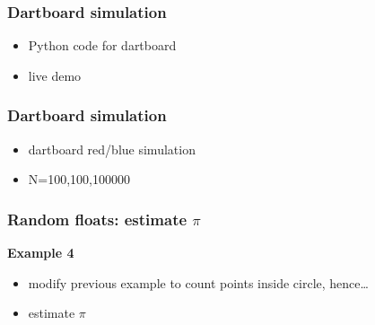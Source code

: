 \documentclass[english,14pt]{beamer}
\begin{document}

\begin{frame}[fragile]

\frametitle{Dartboard simulation}

\begin{itemize}
	\item Python code for dartboard
	\item live demo
\end{itemize}

\end{frame}


\begin{frame}[fragile]

\frametitle{Dartboard simulation}

\begin{itemize}
	\item dartboard red/blue simulation
	\item N=100,100,100000
\end{itemize}

\end{frame}


\begin{frame}[fragile]

\frametitle{Random floats: estimate $\pi$}

\textbf{Example 4}\\
\vspace*{5mm}
\begin{itemize}
	\item modify previous example to count points inside circle, hence\ldots
	\item estimate $\pi$
\end{itemize}

\end{frame}

%
%
%
%
%
%
%
%
%
%
%
%
%
%
\end{document}
